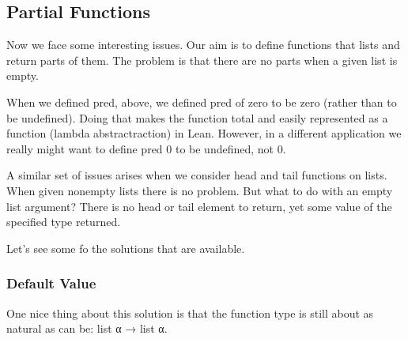 \documentclass[letterpaper,10pt,english]{sphinxmanual}
\begin{document}
\subsection{Partial Functions}
\label{\detokenize{A_03_Recursive_Types:partial-functions}}
\sphinxAtStartPar
Now we face some interesting issues. Our aim is to define
functions that  lists and return parts of them.
The problem is that there are no parts when a given list
is empty.

\sphinxAtStartPar
When we defined pred, above, we defined pred of zero to be
zero (rather than to be undefined). Doing that makes the
function total and easily represented as a function (lambda
abstractraction) in Lean. However, in a different application
we really might want to define pred 0 to be undefined, not 0.

\sphinxAtStartPar
A similar set of issues arises when we consider head and
tail functions on lists. When given non\sphinxhyphen{}empty lists there
is no problem. But what to do with an empty list argument?
There is no head or tail element to return, yet some value
of the specified type  returned.

\sphinxAtStartPar
Let’s see some fo the solutions that are available.


\subsubsection{Default Value}
\label{\detokenize{A_03_Recursive_Types:default-value}}
\begin{sphinxVerbatim}[commandchars=\\\{\}]
           
    
    
  \PYG{o}{[}\PYG{o}{]}
\end{sphinxVerbatim}

\sphinxAtStartPar
One nice thing about this solution
is that the function type is still about as natural as
can be: list α → list α.
\end{document}
